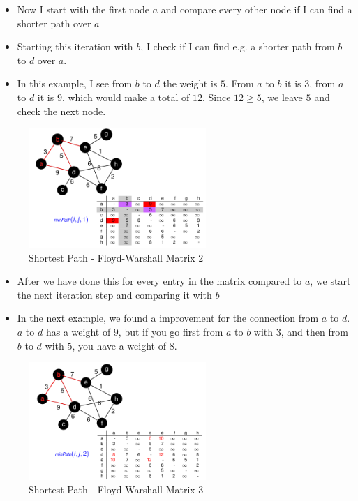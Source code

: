 \begin{itemize}
    \item Now I start with the first node $a$ and compare every other node if I can find a shorter path over $a$
    \item Starting this iteration with $b$, I check if I can find e.g. a shorter path from $b$ to $d$ over $a$.
    \item In this example, I see from $b$ to $d$ the weight is $5$. From $a$ to $b$ it is $3$, from $a$ to $d$ it is $9$, which would make a total of $12$. Since $12 \geq 5$, we leave $5$ and check the next node.
\end{itemize}

\begin{figure}[H]
\centering
\includegraphics[width=0.6\textwidth]{figures/floyd2.png}
\caption{Shortest Path - Floyd-Warshall Matrix 2}
\end{figure}

\begin{itemize}
    \item After we have done this for every entry in the matrix compared to $a$, we start the next iteration step and comparing it with $b$
    \item In the next example, we found a improvement for the connection from $a$ to $d$. $a$ to $d$ has a weight of $9$, but if you go first from $a$ to $b$ with $3$, and then from $b$ to $d$ with $5$, you have a weight of $8$.
\end{itemize}

\begin{figure}[H]
\centering
\includegraphics[width=0.6\textwidth]{figures/floyd3.png}
\caption{Shortest Path - Floyd-Warshall Matrix 3}
\end{figure}

